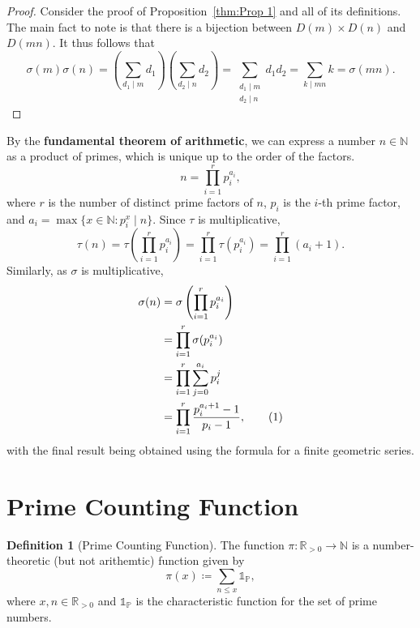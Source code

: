 \documentclass[a4paper]{article}
\theoremstyle{definition}
\newtheorem{definition}{Definition}
\begin{document}
\begin{proof}
    Consider the proof of Proposition~\ref{thm:Prop 1} and all of its definitions.
    The main fact to note is that there is a bijection between $D(m) \times D(n)$ and $D(mn)$.
    It thus follows that
    \begin{equation*}
        \sigma(m)\sigma(n) = \left( \sum_{d_1 \mid m} d_1 \right) \left( \sum_{d_2 \mid n} d_2 \right) = \sum_{\substack{d_1 \mid m \\ d_2 \mid n}} d_1 d_2 = \sum_{k \mid mn} k = \sigma(mn).
    \end{equation*}
\end{proof}
By the \textbf{fundamental theorem of arithmetic}, we can express a number $n \in \mathbb{N}$ as a product of primes, which is unique up to the order of the factors.
\begin{equation*}
    n = \prod_{i=1}^r p_i^{a_i},
\end{equation*}
where $r$ is the number of distinct prime factors of $n$, $p_i$ is the $i$-th prime factor, and $a_i = \max \{x \in \mathbb{N} \mathrel{:} p_i^x \mid n \}$.
Since $\tau$ is multiplicative,
\begin{equation}
    \tau(n) = \tau \left( \prod_{i=1}^r p_i^{a_i} \right) = \prod_{i=1}^r \tau (p_i^{a_i}) = \prod_{i=1}^r (a_i + 1).
\end{equation}
Similarly, as $\sigma$ is multiplicative,
\begin{align*}
    \sigma(n) & = \sigma \left( \prod_{i=1}^r p_i^{a_i} \right)                                           \\
              & = \prod_{i=1}^r \sigma (p_i^{a_i})                                                        \\
              & = \prod_{i=1}^r \sum_{j=0}^{a_i} p_i^j                                                    \\
              & = \prod_{i=1}^r \frac{p_i^{a_i+1} - 1}{p_i - 1}, \stepcounter{equation}\tag{\theequation}
\end{align*}
with the final result being obtained using the formula for a finite geometric series.

\section{Prime Counting Function}

\begin{definition}[Prime Counting Function]
    The function $\pi: \mathbb{R}_{>0} \to \mathbb{N}$ is a number-theoretic (but not arithemtic) function given by
    \begin{equation*}
        \pi(x) \coloneq \sum_{n \leq x} \mathds{1}_\mathbb{P},
    \end{equation*}
    where $x, n \in \mathbb{R}_{>0}$ and $\mathds{1}_\mathbb{P}$ is the characteristic function for the set of prime numbers.
\end{definition}
\end{document}
